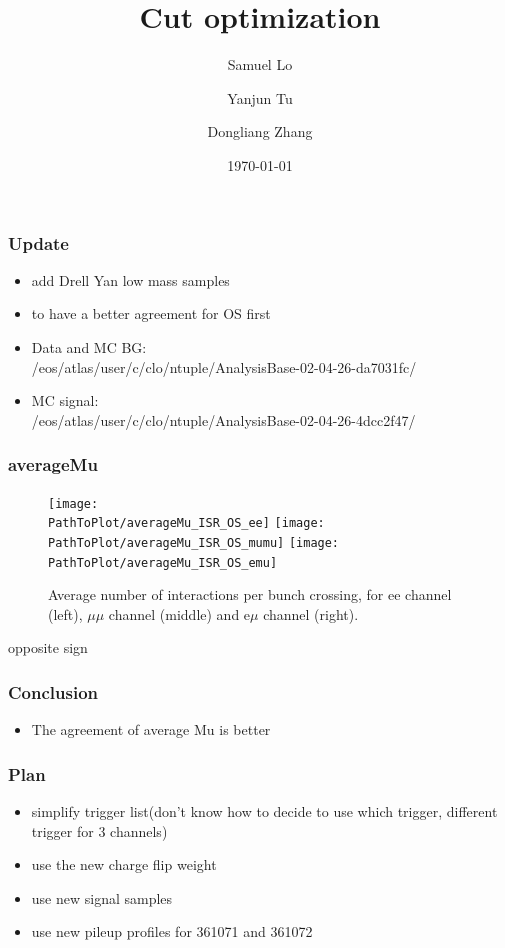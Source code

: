 \documentclass[mathserif,serif]{beamer}
\title{Cut optimization}
\author
{
Samuel Lo \inst{1}
\and
Yanjun Tu  \inst{1}
\and
Dongliang Zhang  \inst{2}
}
\institute
{
\inst{1}
The University of Hong Kong
\and
\inst{2}
University of Michigan
}
\date{\today}
\begin{document}
\frame{\titlepage}

\begin{frame}
\frametitle{Update}
\begin{itemize}
\small
\item add Drell Yan low mass samples
\item to have a better agreement for OS first
\item Data and MC BG: \\
/eos/atlas/user/c/clo/ntuple/AnalysisBase-02-04-26-da7031fc/
\item MC signal: \\
/eos/atlas/user/c/clo/ntuple/AnalysisBase-02-04-26-4dcc2f47/
\end{itemize}
\end{frame}

\def \PathToPlot {../plot}
\begin{frame}
\frametitle{averageMu}
\begin{figure}
\texttt{[image: \\PathToPlot/averageMu\_ISR\_OS\_ee]}
\texttt{[image: \\PathToPlot/averageMu\_ISR\_OS\_mumu]}
\texttt{[image: \\PathToPlot/averageMu\_ISR\_OS\_emu]} \\
\caption{Average number of interactions per bunch crossing, for ee channel (left), $\mu\mu$ channel (middle) and e$\mu$ channel (right).}
\end{figure}
\end{frame}

\begin{frame}
\begin{center}
\huge
opposite sign
\end{center}
\end{frame}


%

\def \PathToPlot {../plot}


%

\begin{frame}
\frametitle{Conclusion}
\begin{itemize}
\item The agreement of average Mu is better
\end{itemize}
\end{frame}

\begin{frame}
\frametitle{Plan}
\begin{itemize}
\item simplify trigger list(don't know how to decide to use which trigger, different trigger for 3 channels)
\item use the new charge flip weight
\item use new signal samples
\item use new pileup profiles for 361071 and 361072
\end{itemize}
\end{frame}
\end{document}
